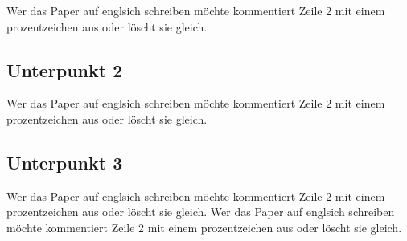 \documentclass[12pt,twocolumn,twoside]{conference}
\begin{document}
Wer das Paper auf englsich schreiben möchte kommentiert Zeile 2 mit einem prozentzeichen aus oder löscht sie gleich.
\subsection{Unterpunkt 2}
Wer das Paper auf englsich schreiben möchte kommentiert Zeile 2 mit einem prozentzeichen aus oder löscht sie gleich.
\subsection{Unterpunkt 3}
Wer das Paper auf englsich schreiben möchte kommentiert Zeile 2 mit einem prozentzeichen aus oder löscht sie gleich. Wer das Paper auf englsich schreiben möchte kommentiert Zeile 2 mit einem prozentzeichen aus oder löscht sie gleich.
\end{document}
